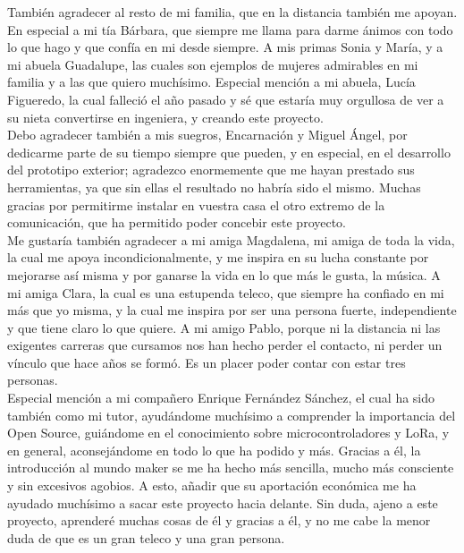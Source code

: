 \documentclass[12pt]{article}
\begin{document}
	\noindent También agradecer al resto de mi familia, que en la distancia también me apoyan. En especial a mi tía Bárbara, que siempre me llama para darme ánimos con todo lo que hago y que confía en mi desde siempre. A mis primas Sonia y María, y a mi abuela Guadalupe, las cuales son ejemplos de mujeres admirables en mi familia y a las que quiero muchísimo. Especial mención a mi abuela, Lucía Figueredo, la cual falleció el año pasado y sé que estaría muy orgullosa de ver a su nieta convertirse en ingeniera, y creando este proyecto. \\
	
	\noindent Debo agradecer también a mis suegros, Encarnación y Miguel Ángel, por dedicarme parte de su tiempo siempre que pueden, y en especial, en el desarrollo del prototipo exterior; agradezco enormemente que me hayan prestado sus herramientas, ya que sin ellas el resultado no habría sido el mismo. Muchas gracias por permitirme instalar en vuestra casa el otro extremo de la comunicación, que ha permitido poder concebir este proyecto. \\
	
	\noindent Me gustaría también agradecer a mi amiga Magdalena, mi amiga de toda la vida, la cual me apoya incondicionalmente, y me inspira en su lucha constante por mejorarse así misma y por ganarse la vida en lo que más le gusta, la música. A mi amiga Clara, la cual es una estupenda teleco, que siempre ha confiado en mi más que yo misma, y la cual me inspira por ser una persona fuerte, independiente y que tiene claro lo que quiere. A mi amigo Pablo, porque ni la distancia ni las exigentes carreras que cursamos nos han hecho perder el contacto, ni perder un vínculo que hace años se formó. Es un placer poder contar con estar tres personas.\\  
	
	\noindent Especial mención a mi compañero Enrique Fernández Sánchez, el cual ha sido también como mi tutor, ayudándome muchísimo a comprender la importancia del Open Source, guiándome en el conocimiento sobre microcontroladores y LoRa, y en general, aconsejándome en todo lo que ha podido y más. Gracias a él, la introducción al mundo maker se me ha hecho más sencilla, mucho más consciente y sin excesivos agobios. A esto, añadir que su aportación económica me ha ayudado muchísimo a sacar este proyecto hacia delante. Sin duda, ajeno a este proyecto, aprenderé muchas cosas de él y gracias a él, y no me cabe la menor duda de que es un gran teleco y una gran persona.\\
	
\end{document}
